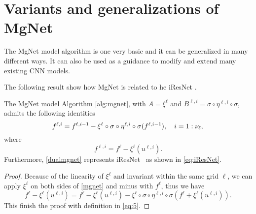 \section{Variants and generalizations of MgNet}\label{sec:relation}

The MgNet model algorithm is one very basic and it can be generalized
in many different ways. It can also be used as a guidance to modify and 
extend many existing CNN models. 

The following result show how MgNet is related to he iResNet \cite{he2016identity}. 
\begin{theorem}\label{thm:mgnet1}
The MgNet model Algorithm \ref{alg:mgnet}, 
with $A=\xi^\ell$ and $B^{\ell,i}=\sigma \circ \eta^{\ell,i}\circ\sigma$, 
admits the following identities
\begin{equation}\label{dualmgnet}
f^{\ell, i} = f^{\ell, i-1} -  \xi^{\ell} \circ \sigma \circ \eta^{\ell,i}\circ \sigma (f^{\ell,i-1}), \quad i = 1:\nu_\ell, \\
\end{equation}
where
\begin{equation}
  \label{eq:5}
	f^{\ell,i} = f^{\ell} - \xi^{\ell} (u^{\ell,i}).   
\end{equation}
Furthermore, \eqref{dualmgnet} represents iResNet~\cite{he2016identity} 
as shown in \eqref{eq:iResNet}.
\end{theorem}

\begin{proof}
	Because of the linearity of $\xi^\ell$ and invariant within the same grid $\ell$, 
	we can apply $\xi^\ell$ on both sides of \eqref{mgnet} and minus with
	$f^\ell$, thus we have
	$$
	f^{\ell} - \xi^{\ell} (u^{\ell,i})= f^{\ell} - \xi^\ell(u^{\ell,i}) -
	\xi^{\ell} \circ \sigma \circ \eta^{\ell,i}\circ \sigma (f^\ell + \xi^\ell(u^{\ell,i})).
	$$
This finish the proof with definition in \eqref{eq:5}.
\end{proof}

